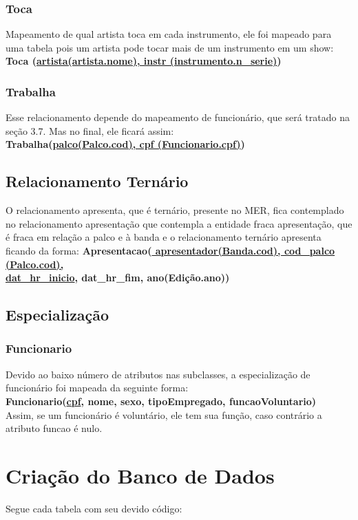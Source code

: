 \documentclass[12pt]{article}
\begin{document}
\subsubsection{Toca}
Mapeamento de qual artista toca em cada instrumento, ele foi mapeado para uma tabela pois um artista pode tocar mais de um instrumento em um show:\\
\textbf{Toca (\underline{artista(artista.nome), instr (instrumento.n\_serie)})}

\subsubsection{Trabalha}
Esse relacionamento depende do mapeamento de funcionário, que será tratado na seção 3.7. Mas no final, ele ficará assim: \\
\textbf{Trabalha(\underline{palco(Palco.cod), cpf (Funcionario.cpf)})}

\subsection{Relacionamento Ternário}
O relacionamento apresenta, que é ternário, presente no MER, fica contemplado no relacionamento apresentação que contempla a entidade fraca  apresentação, que é fraca em relação a palco e à banda e o relacionamento ternário apresenta ficando da forma:
\textbf{Apresentacao(\underline{  apresentador(Banda.cod), cod\_palco (Palco.cod),} \\ \underline{  dat\_hr\_inicio}, dat\_hr\_fim, ano(Edição.ano))}

\subsection{Especialização}
\subsubsection{Funcionario}
Devido ao baixo número de atributos nas subclasses, a especialização de funcionário foi mapeada da seguinte forma:\\

\textbf{Funcionario(\underline{cpf}, nome, sexo, tipoEmpregado, funcaoVoluntario)}\\

Assim, se um funcionário é voluntário, ele tem sua função, caso contrário a atributo funcao é nulo.
\section{Criação do Banco de Dados}
Segue cada tabela com seu devido código\cite{pg9v1a}:
\end{document}
